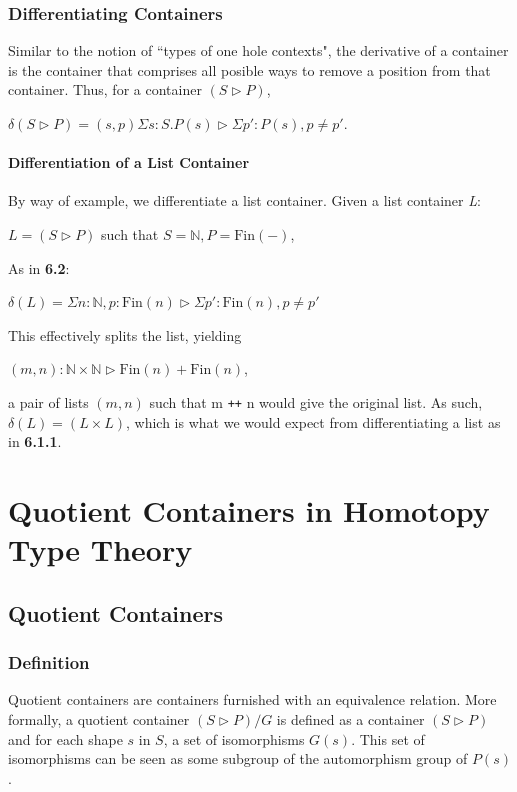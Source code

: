 \documentclass[12pt]{report}
\begin{document}
\section{Differentiating Containers}
Similar to the notion of ``types of one hole contexts", the derivative of a container is the container that comprises all posible ways to remove a position from that container.
\newpage
Thus, for a container $(S \rhd P)$,
\begin{center}
$\delta (S \rhd P) = (s,p) \Sigma s : S . P(s) \rhd \Sigma p':P(s),p \neq p'$.
\end{center}



\subsection{Differentiation of a List Container}
By way of example, we differentiate a list container. Given a list container \textit{L}:
\begin{center}
$L = (S \rhd P)$ such that $S = \mathbb{N}, P = \text{Fin}(-)$,
\end{center}
As in \textbf{6.2}:
\begin{center}
$\delta(L) = \Sigma n : \mathbb{N}, p: \text{Fin}(n) \rhd \Sigma p' : \text{Fin}(n), p \neq p'$
\end{center} 
This effectively splits the list, yielding
\begin{center}
$(m,n): \mathbb{N} \times \mathbb{N} \rhd \text{Fin}(n) + \text{Fin}(n)$,
\end{center}
a pair of lists $(m,n)$ such that m \texttt{++} n would give the original list. As such, $\delta(L) = (L \times L)$, which is what we would expect from differentiating a list as in \textbf{6.1.1}.



\part{Quotient Containers in Homotopy Type Theory}
\chapter{Quotient Containers}
\section{Definition}
Quotient containers are containers furnished with an equivalence relation. More formally, a quotient container $(S \rhd P)/G$ is defined as a container $(S \rhd P)$ and for each shape $s$ in $S$, a set of isomorphisms $G(s)$. This set of isomorphisms can be seen as some subgroup of the automorphism group of $P(s)$.
\end{document}
